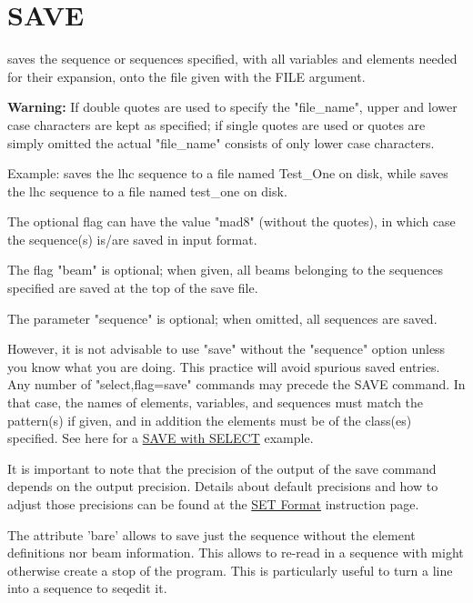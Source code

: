 \section{SAVE}
\label{sec:save}
saves the sequence or sequences specified, with all variables and elements needed
for their expansion, onto the file given with the FILE argument.

{\bf Warning:} If double quotes are used to specify
the "file\_name", upper and lower case characters are kept as specified;
if single quotes are used or quotes are simply omitted the actual
"file\_name" consists of only lower case characters. 

Example:
saves the lhc sequence to a file named Test\_One on disk, while
saves the lhc sequence to a file named test\_one on disk.

The optional flag can have the value "mad8" (without the quotes), in
which case the sequence(s) is/are saved in \madeight input format.  

The flag "beam" is optional; when given, all beams belonging to the
sequences specified are saved at the top of the save file.  

The parameter "sequence" is optional; when omitted, all sequences are
saved.  

However, it is not advisable to use "save" without the "sequence" option
unless you know what you are doing. This practice will avoid spurious
saved entries.    Any number of "select,flag=save" commands may precede
the SAVE command. In that case, the names of elements, variables, and
sequences must match the pattern(s) if given, and in addition the
elements must be of the class(es) specified. See here for a
\href{../Introduction/select.html#save_select}{SAVE with SELECT}
example.  

It is important to note that the precision of the output of the save
command depends on the output precision. Details about default
precisions and how to adjust those precisions can be found at the
\href{../Introduction/set.html#Format}{SET Format} instruction page.   
 
The attribute 'bare' allows to save just the sequence without the
element definitions nor beam information. This allows to re-read in a
sequence with might otherwise create a stop of the program. This is
particularly useful to turn a line into a sequence to seqedit
it. 

